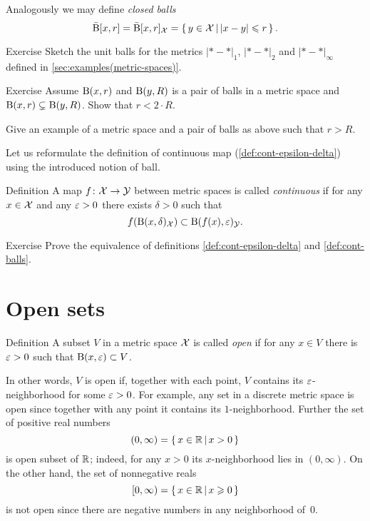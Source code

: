 Analogously we may define \emph{closed balls} 
\[\bar{\mathrm{B}}[x,r]=\bar{\mathrm{B}}[x,r]_{\mathcal{X}}=\left\{\,{y\in \mathcal{X}}\,\middle|\,{|x-y|\leqslant r}\,\right\}.\] 

\begin{thm}{Exercise}\label{ex:d1+d2+dinfty-balls}
Sketch the unit balls for the metrics $|{*}-{*}|_1$, $|{*}-{*}|_2$ and $|{*}-{*}|_\infty$ defined in \ref{sec:examples(metric-spaces)}.
\end{thm}

\begin{thm}{Exercise}\label{ex:r<2R}
Assume $\mathrm{B}(x,r)$  and $\mathrm{B}(y,R)$ is a pair of balls in a metric space 
and $\mathrm{B}(x,r)\subsetneq \mathrm{B}(y,R)$.
Show that $r<2\cdot R$.

Give an example of a metric space and a pair of balls as above such that $r> R$.
\end{thm}

Let us reformulate the definition of continuous map (\ref{def:cont-epsilon-delta}) using the introduced notion of ball.

\begin{thm}{Definition}\label{def:cont-balls}
A map $f\colon\mathcal{X}\to\mathcal{Y}$ between metric spaces is called \emph{continuous} if for any $x\in \mathcal{X}$ and any $\varepsilon>0$ there exists $\delta>0$ such that 
\[f(\mathrm{B}(x,\delta)_{\mathcal{X}})\subset\mathrm{B}(f(x),\varepsilon)_{\mathcal{Y}}.\]

\end{thm}

\begin{thm}{Exercise}\label{ex:def:cont-epsilon-delta=def:cont-balls}
Prove the equivalence of definitions \ref{def:cont-epsilon-delta} and \ref{def:cont-balls}.
\end{thm}



\section{Open sets}

\begin{thm}{Definition}\label{def:open}
A subset $V$ in a metric space $\mathcal{X}$ is called \emph{open} if for any $x\in V$ there is $\varepsilon>0$ such that $\mathrm{B}(x,\varepsilon)\subset V$.
\end{thm}

In other words, $V$ is open if, together with each point, $V$ contains its $\varepsilon$-neighborhood for some $\varepsilon>0$.
For example, any set in a discrete metric space is open since together with any point it contains its $1$-neighborhood.
Further the set of positive real numbers
\[(0,\infty)=\left\{\,{x\in\mathbb{R}}\,\middle|\,{x>0}\,\right\}\] 
is open subset of $\mathbb{R}$; indeed, for any $x>0$ its $x$-neighborhood lies in $(0,\infty)$.
On the other hand, the set of nonnegative reals 
\[[0,\infty)=\left\{\,{x\in\mathbb{R}}\,\middle|\,{x\geqslant0}\,\right\}\]
is not open since there are negative numbers in any neighborhood of~$0$.

